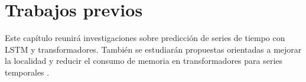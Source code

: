 \section{Trabajos previos}

Este capítulo reunirá investigaciones sobre predicción de series de tiempo con LSTM y transformadores. También se estudiarán propuestas orientadas a mejorar la localidad y reducir el consumo de memoria en transformadores para series temporales \cite{li2019enhancing}.
